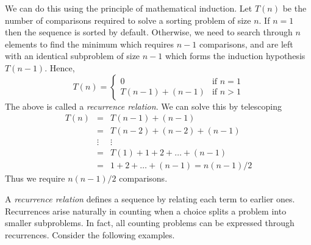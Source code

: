 We can do this using the principle of mathematical induction. Let $T(n)$ be the number of comparisons required to solve a sorting problem of size $n$. If $n = 1$ then the sequence is sorted by default. Otherwise, we need to search
through $n$ elements to find the minimum which requires $n - 1$ comparisons, and are left with an identical subproblem of size $n-1$ which forms the induction hypothesis $T(n-1)$. Hence,
\[
T(n) = \left\{ 
            \begin{array}{ll}
            0 & \mbox{if $n = 1$} \\
            T(n-1) + (n-1) & \mbox{if $n > 1$}
            \end{array}
           \right.
\]
The above is called a \emph{recurrence relation}. We can solve this by telescoping
\[
\begin{array}{lll}
T(n) & = & T(n-1) + (n-1) \\
        & = & T(n-2) + (n-2) + (n-1) \\
        & \vdots & \vdots \\
         & = & T(1) + 1 + 2 + \ldots + (n-1) \\
         & = &  1 + 2 + \ldots + (n-1) = n(n-1)/2
\end{array}
\]
Thus we require $n(n-1)/2$ comparisons.


A \emph{recurrence relation} defines a sequence by relating each term to earlier ones.
Recurrences arise naturally in counting when a choice splits a problem into
smaller subproblems.  In fact, all counting problems can be expressed through recurrences. Consider the following examples.

